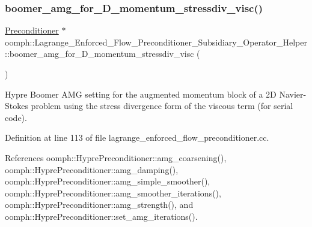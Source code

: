 \subsubsection{\texorpdfstring{boomer\+\_\+amg\+\_\+for\+\_\+D\+\_\+momentum\+\_\+stressdiv\+\_\+visc()}{boomer\_amg\_for\_2D\_momentum\_stressdiv\_visc()}}
{\footnotesize\ttfamily \hyperlink{classoomph_1_1Preconditioner}{Preconditioner} $\ast$ oomph\+::\+Lagrange\+\_\+\+Enforced\+\_\+\+Flow\+\_\+\+Preconditioner\+\_\+\+Subsidiary\+\_\+\+Operator\+\_\+\+Helper\+::boomer\+\_\+amg\+\_\+for\+\_\+D\+\_\+momentum\+\_\+stressdiv\+\_\+visc (\begin{DoxyParamCaption}{ }\end{DoxyParamCaption})}



Hypre Boomer A\+MG setting for the augmented momentum block of a 2D Navier-\/\+Stokes problem using the stress divergence form of the viscous term (for serial code). 



Definition at line 113 of file lagrange\+\_\+enforced\+\_\+flow\+\_\+preconditioner.\+cc.



References oomph\+::\+Hypre\+Preconditioner\+::amg\+\_\+coarsening(), oomph\+::\+Hypre\+Preconditioner\+::amg\+\_\+damping(), oomph\+::\+Hypre\+Preconditioner\+::amg\+\_\+simple\+\_\+smoother(), oomph\+::\+Hypre\+Preconditioner\+::amg\+\_\+smoother\+\_\+iterations(), oomph\+::\+Hypre\+Preconditioner\+::amg\+\_\+strength(), and oomph\+::\+Hypre\+Preconditioner\+::set\+\_\+amg\+\_\+iterations().

\mbox{\label{namespaceoomph_1_1Lagrange__Enforced__Flow__Preconditioner__Subsidiary__Operator__Helper_a79c7dcff04b79b203184452f2835f0fd}} 

